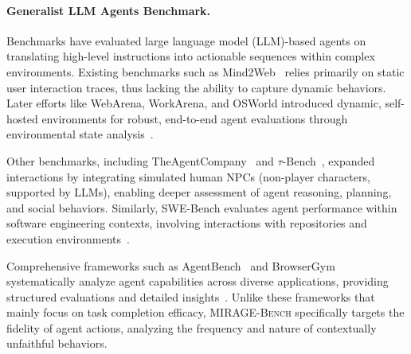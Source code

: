 \vspace{-2mm}
\paragraph{Generalist LLM Agents Benchmark.}
Benchmarks have evaluated large language model (LLM)-based agents on translating high-level instructions into actionable sequences within complex environments. Existing benchmarks such as Mind2Web~\cite{deng2023mind2web} relies primarily on static user interaction traces, thus lacking the ability to capture dynamic behaviors. Later efforts like WebArena, WorkArena, and OSWorld introduced dynamic, self-hosted environments for robust, end-to-end agent evaluations through environmental state analysis~\cite{zhou2023webarena,drouin2024workarena,xie2024osworld}.

Other benchmarks, including TheAgentCompany~\cite{xu2024theagentcompany} and $\tau$-Bench~\cite{yao2024taubenchbenchmarktoolagentuserinteraction}, expanded interactions by integrating simulated human NPCs (non-player characters, supported by LLMs), enabling deeper assessment of agent reasoning, planning, and social behaviors. Similarly, SWE-Bench evaluates agent performance within software engineering contexts, involving interactions with repositories and execution environments~\cite{jimenez2023swe}.

Comprehensive frameworks such as AgentBench~\cite{liu2023agentbench} and BrowserGym~\cite{chezelles2024browsergym} systematically analyze agent capabilities across diverse applications, providing structured evaluations and detailed insights~\cite{bai2024digirl}. Unlike these frameworks that mainly focus on task completion efficacy, \textsc{MIRAGE-Bench} specifically targets the fidelity of agent actions, analyzing the frequency and nature of contextually unfaithful behaviors.

